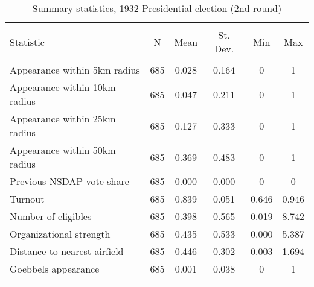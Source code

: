 
\begin{table}[!htbp] \centering 
  \caption{Summary statistics, 1932 Presidential election (2nd round)} 
  \label{tab:sumstats1932pres} 
\begin{tabular}{@{\extracolsep{5pt}}lccccc} 
\\[-1.8ex]\hline \\[-1.8ex] 
Statistic & \multicolumn{1}{c}{N} & \multicolumn{1}{c}{Mean} & \multicolumn{1}{c}{St. Dev.} & \multicolumn{1}{c}{Min} & \multicolumn{1}{c}{Max} \\ 
\hline \\[-1.8ex] 
Appearance within 5km radius & 685 & 0.028 & 0.164 & 0 & 1 \\ 
Appearance within 10km radius & 685 & 0.047 & 0.211 & 0 & 1 \\ 
Appearance within 25km radius & 685 & 0.127 & 0.333 & 0 & 1 \\ 
Appearance within 50km radius & 685 & 0.369 & 0.483 & 0 & 1 \\ 
Previous NSDAP vote share & 685 & 0.000 & 0.000 & 0 & 0 \\ 
Turnout & 685 & 0.839 & 0.051 & 0.646 & 0.946 \\ 
Number of eligibles & 685 & 0.398 & 0.565 & 0.019 & 8.742 \\ 
Organizational strength & 685 & 0.435 & 0.533 & 0.000 & 5.387 \\ 
Distance to nearest airfield & 685 & 0.446 & 0.302 & 0.003 & 1.694 \\ 
Goebbels appearance & 685 & 0.001 & 0.038 & 0 & 1 \\ 
\hline \\[-1.8ex] 
\end{tabular} 
\end{table} 
